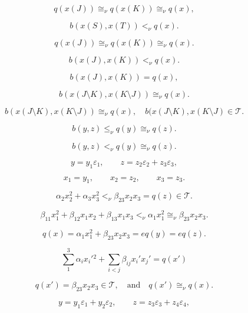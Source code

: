 \documentclass{article}
\begin{document}
$$q(x(J))\cong_\nu q(x(K))\cong_\nu q(x),$$

$$b(x(S),x(T))<_\nu q(x).$$

$$q(x(J))\cong_\nu q(x(K))\cong_\nu q(x).$$

\begin{equation}\label{eq:7.4}
b(x(J),x(K))<_\nu q(x). \end{equation}

\begin{equation}\label{eq:7.5}
b(x(J),x(K))= q(x), \end{equation}

\begin{equation}\label{eq:7.6}
b(x(J{\setminus} K),x(K{\setminus} J))\cong_\nu q(x). \end{equation}

\begin{equation}\label{eq:7.7}
b(x(J{\setminus} K),x(K{\setminus} J))\cong_\nu q(x),\quad
b(x(J{\setminus} K),x(K{\setminus} J)\in {\mathcal T}.
\end{equation}

\begin{equation}\label{eq:7.6.b}
b(y,z)\le_\nu q(y)\cong_\nu q(z).
\end{equation}

\begin{equation}\label{eq:7.7.b}
b(y,z)<_\nu q(y)\cong_\nu q(z).
\end{equation}

$$y=y_1{\varepsilon}_1,\qquad z=z_2{\varepsilon}_2+z_3{\varepsilon}_3,$$

$$x_1=y_1,\qquad x_2=z_2,\qquad x_3=z_3.$$

\begin{equation}\label{eq:7.8}
{\alpha}_2x_2^2+{\alpha}_3x_3^2<_\nu{\beta}_{23}x_2x_3=q(z)\in{\mathcal T}.\end{equation}

\begin{equation}\label{eq:7.9}
{\beta}_{11}x_1^2+{\beta}_{12}x_1x_2+{\beta}_{13}x_1x_3<_\nu{\alpha}_1x_1^2\cong_\nu{\beta}_{23}x_2x_3.
\end{equation}

$$q(x)={\alpha}_1x_1^2+{\beta}_{23}x_2x_3=eq(y)=eq(z).$$

$$\sum_1^3{\alpha}_ix_i'{}^{2}+\sum_{i<j}{\beta}_{ij}x_i'x_j'=q(x')$$

$$q(x')={\beta}_{23}x_2x_3\in {\mathcal T},\quad\text{and}\quad
q(x')\cong_\nu q(x).$$

$$y=y_1{\varepsilon}_1+y_2{\varepsilon}_2,\qquad
z=z_3{\varepsilon}_3+z_4{\varepsilon}_4,$$
\end{document}
